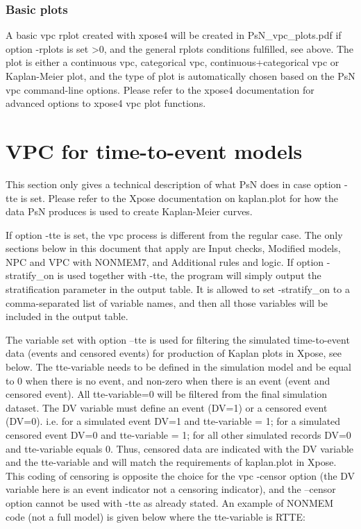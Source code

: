 \subsubsection*{Basic plots}
A basic vpc rplot created with xpose4 will be created in 
PsN\_vpc\_plots.pdf if option -rplots is set >0,
and the general rplots conditions fulfilled, see above.
The plot is either a continuous vpc, categorical vpc, continuous+categorical vpc or Kaplan-Meier 
plot, and the type of plot is automatically chosen based on the PsN vpc command-line options.
Please refer to the xpose4 documentation for advanced options to xpose4 vpc plot functions.


\section {VPC for time-to-event models}
This section only gives a technical description of what PsN does in case option -tte is set. Please refer to the Xpose documentation on kaplan.plot for how the data PsN produces is used to create Kaplan-Meier curves.

If option -tte is set, the vpc process is different from the regular case. The only sections below in this document that apply are Input checks, Modified models, NPC and VPC with NONMEM7, and Additional rules and logic. If option -stratify\_on is used together with -tte, the program will simply output the stratification parameter in the output table. It is allowed to set -stratify\_on to a comma-separated list of variable names, and then all those variables will be included in the output table.  

The variable set with option –tte is used for filtering the simulated time-to-event data (events and censored events) for production of Kaplan plots in Xpose, see below. The tte-variable needs to be defined in the simulation model and be equal to 0 when there is no event, and non-zero when there is an event (event and censored event). All tte-variable=0 will be filtered from the final simulation dataset. The DV variable must define an event (DV=1) or a censored event (DV=0).  i.e. for a simulated event DV=1 and tte-variable = 1; for a simulated censored event DV=0 and tte-variable = 1; for all other simulated records DV=0 and tte-variable equals 0. Thus, censored data are indicated with the DV variable and the tte-variable and will match the requirements of kaplan.plot in Xpose. This coding of censoring is opposite the choice for the vpc -censor option (the DV variable here is an event indicator not a censoring indicator), and the –censor option cannot be used with -tte as already stated. An example of NONMEM code (not a full model) is given below where the tte-variable is RTTE:

